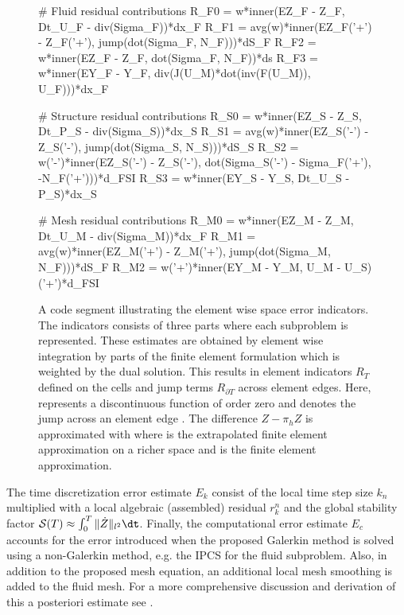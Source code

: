 \begin{figure}
\caption{A code segment illustrating the element wise space error
  indicators. The indicators consists of three parts where each
  subproblem is represented. These estimates are obtained by element
  wise integration by parts of the finite element formulation which is
  weighted by the dual solution. This results in element indicators
  $R_T$ defined on the cells and jump terms $R_{\partial T}$ across
  element edges. Here,  represents a discontinuous function of
  order zero and  denotes the jump across an element edge
  . The difference $Z -\pi_h Z$ is approximated with  where  is the extrapolated finite element approximation
  on a richer space and  is the finite element approximation.}
\label{selim:fig:strong_residuals}
\begin{python}
    # Fluid residual contributions
    R_F0 = w*inner(EZ_F - Z_F, Dt_U_F - div(Sigma_F))*dx_F
    R_F1 = avg(w)*inner(EZ_F('+') - Z_F('+'), jump(dot(Sigma_F, N_F)))*dS_F
    R_F2 = w*inner(EZ_F - Z_F, dot(Sigma_F, N_F))*ds
    R_F3 = w*inner(EY_F - Y_F, div(J(U_M)*dot(inv(F(U_M)), U_F)))*dx_F

    # Structure residual contributions
    R_S0 = w*inner(EZ_S - Z_S, Dt_P_S - div(Sigma_S))*dx_S
    R_S1 = avg(w)*inner(EZ_S('-') - Z_S('-'), jump(dot(Sigma_S, N_S)))*dS_S
    R_S2 = w('-')*inner(EZ_S('-') - Z_S('-'), dot(Sigma_S('-') - Sigma_F('+'), -N_F('+')))*d_FSI
    R_S3 = w*inner(EY_S - Y_S, Dt_U_S - P_S)*dx_S

    # Mesh residual contributions
    R_M0 = w*inner(EZ_M - Z_M, Dt_U_M - div(Sigma_M))*dx_F
    R_M1 = avg(w)*inner(EZ_M('+') - Z_M('+'), jump(dot(Sigma_M, N_F)))*dS_F
    R_M2 = w('+')*inner(EY_M - Y_M, U_M - U_S)('+')*d_FSI
\end{python}
\end{figure}
The time discretization error estimate $E_k$ consist of the local time
step size $k_n$ multiplied with a local algebraic (assembled) residual
$r_k^n$ and the global stability factor $\mathcal{S}(T) \approx
\int_0^T \| \dot{Z} \|_{l^2}\dt$. Finally, the computational error
estimate $E_c$ accounts for the error introduced when the proposed
Galerkin method is solved using a non-Galerkin method, e.g. the IPCS
for the fluid subproblem. Also, in addition to the proposed mesh
equation, an additional local mesh smoothing is added to the fluid
mesh.  For a more comprehensive discussion and derivation of this a
posteriori estimate see \citet{SelimNarayananEtAl2010}.

